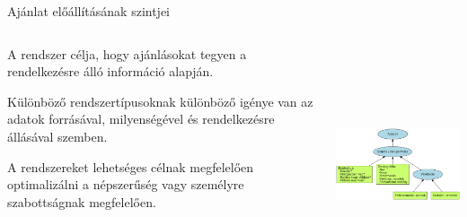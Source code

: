 \documentclass[english, aspectratio=169]{beamer}
\begin{document}
\begin{frame}{Ajánlat előállításának szintjei}
\begin{columns}
\begin{column}{.4\textwidth}
A rendszer célja, hogy ajánlásokat tegyen a rendelkezésre álló információ alapján.\par\medskip
Különböző rendszertípusoknak különböző igénye van az adatok forrásával, milyenségével és rendelkezésre állásával szemben.\par\medskip
A rendszereket lehetséges célnak megfelelően optimalizálni a népszerűség vagy személyre szabottságnak megfelelően.
\end{column}
\begin{column}{.6\textwidth}
\begin{center}
\includegraphics[width=8cm, height=7cm, keepaspectratio]{graphs/recommender_1.png}
\end{center}
\end{column}
\end{columns}
\end{frame}
\end{document}
